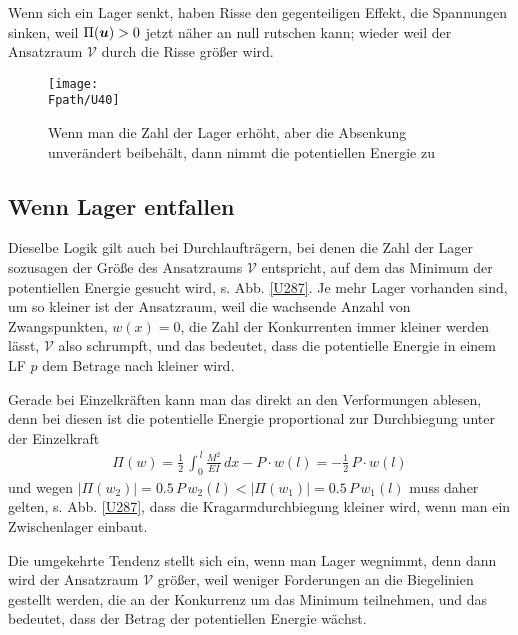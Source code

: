{{{{{Wenn sich ein Lager senkt, haben Risse den gegenteiligen Effekt, die Spannungen sinken, weil $\Pi(\mbox{\boldmath $u$}) > 0$ jetzt n\"{a}her an null rutschen kann; wieder weil der Ansatzraum $\mathcal{V}$ durch die Risse gr\"{o}{\ss}er wird.
\begin{figure}[tbp]
\centering
\if {} \sidecaption \fi
\texttt{[image: \\Fpath/U40]}
\caption{Wenn man die Zahl der Lager erh\"{o}ht, aber die Absenkung unver\"{a}ndert beibeh\"{a}lt, dann nimmt die potentiellen Energie zu}
\label{U40}
\end{figure}%

{\textcolor{sectionTitleBlue}{\subsection{Wenn Lager entfallen}}}
Dieselbe Logik gilt auch bei Durchlauftr\"{a}gern, bei denen die Zahl der Lager sozusagen der Gr\"{o}{\ss}e des Ansatzraums $\mathcal{V}$ entspricht, auf dem das Minimum der potentiellen Energie gesucht wird, s. Abb. \ref{U287}. Je mehr Lager vorhanden sind, um so kleiner ist der Ansatzraum, weil die wachsende Anzahl von Zwangspunkten, $w(x) = 0$, die Zahl der Konkurrenten immer kleiner werden l\"{a}sst, $\mathcal{V}$ also schrumpft, und das bedeutet, dass die potentielle Energie in einem LF $p$ dem Betrage nach kleiner wird.

Gerade bei Einzelkr\"{a}ften kann man das direkt an den Verformungen ablesen, denn bei diesen ist die potentielle Energie proportional zur Durchbiegung unter der Einzelkraft
\begin{align}
\Pi(w) = \frac{1}{2}\,\int_0^{\,l} \frac{M^2}{EI}\,dx - P\cdot w(l) = - \frac{1}{2}\, P \cdot w(l)
\end{align}
und wegen $|\Pi(w_2)| = 0.5 \,P\,w_2(l) < |\Pi(w_1)| = 0.5 \,P\,w_1(l)$ muss daher gelten, s. Abb. \ref{U287}, dass die Kragarmdurchbiegung kleiner wird, wenn man ein Zwischenlager einbaut.

Die umgekehrte Tendenz stellt sich ein, wenn man Lager wegnimmt, denn dann wird der Ansatzraum $\mathcal{V}$ gr\"{o}{\ss}er, weil weniger Forderungen an die Biegelinien gestellt werden, die an der Konkurrenz um das Minimum teilnehmen, und das bedeutet, dass der Betrag der potentiellen Energie w\"{a}chst.

}}}}}
